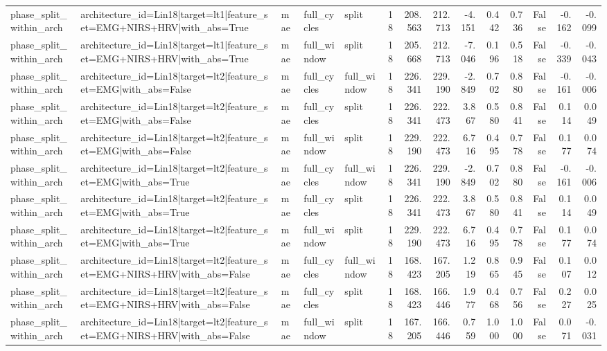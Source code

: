 \begin{table}
\begin{tabular}{lllllrrrrrrrrr}
phase_split_within_arch & architecture_id=Lin18|target=lt1|feature_set=EMG+NIRS+HRV|with_abs=True & mae & full_cycles & split & 18 & 208.563 & 212.713 & -4.151 & 0.442 & 0.736 & False & -0.162 & -0.099 \\
phase_split_within_arch & architecture_id=Lin18|target=lt1|feature_set=EMG+NIRS+HRV|with_abs=True & mae & full_window & split & 18 & 205.668 & 212.713 & -7.046 & 0.196 & 0.518 & False & -0.339 & -0.043 \\
phase_split_within_arch & architecture_id=Lin18|target=lt2|feature_set=EMG|with_abs=False & mae & full_cycles & full_window & 18 & 226.341 & 229.190 & -2.849 & 0.702 & 0.880 & False & -0.161 & -0.006 \\
phase_split_within_arch & architecture_id=Lin18|target=lt2|feature_set=EMG|with_abs=False & mae & full_cycles & split & 18 & 226.341 & 222.473 & 3.867 & 0.580 & 0.841 & False & 0.114 & 0.049 \\
phase_split_within_arch & architecture_id=Lin18|target=lt2|feature_set=EMG|with_abs=False & mae & full_window & split & 18 & 229.190 & 222.473 & 6.716 & 0.495 & 0.778 & False & 0.177 & 0.074 \\
phase_split_within_arch & architecture_id=Lin18|target=lt2|feature_set=EMG|with_abs=True & mae & full_cycles & full_window & 18 & 226.341 & 229.190 & -2.849 & 0.702 & 0.880 & False & -0.161 & -0.006 \\
phase_split_within_arch & architecture_id=Lin18|target=lt2|feature_set=EMG|with_abs=True & mae & full_cycles & split & 18 & 226.341 & 222.473 & 3.867 & 0.580 & 0.841 & False & 0.114 & 0.049 \\
phase_split_within_arch & architecture_id=Lin18|target=lt2|feature_set=EMG|with_abs=True & mae & full_window & split & 18 & 229.190 & 222.473 & 6.716 & 0.495 & 0.778 & False & 0.177 & 0.074 \\
phase_split_within_arch & architecture_id=Lin18|target=lt2|feature_set=EMG+NIRS+HRV|with_abs=False & mae & full_cycles & full_window & 18 & 168.423 & 167.205 & 1.219 & 0.865 & 0.945 & False & 0.107 & 0.012 \\
phase_split_within_arch & architecture_id=Lin18|target=lt2|feature_set=EMG+NIRS+HRV|with_abs=False & mae & full_cycles & split & 18 & 168.423 & 166.446 & 1.977 & 0.468 & 0.756 & False & 0.227 & 0.025 \\
phase_split_within_arch & architecture_id=Lin18|target=lt2|feature_set=EMG+NIRS+HRV|with_abs=False & mae & full_window & split & 18 & 167.205 & 166.446 & 0.759 & 1.000 & 1.000 & False & 0.071 & -0.031 \\

\end{tabular}
\end{table}
